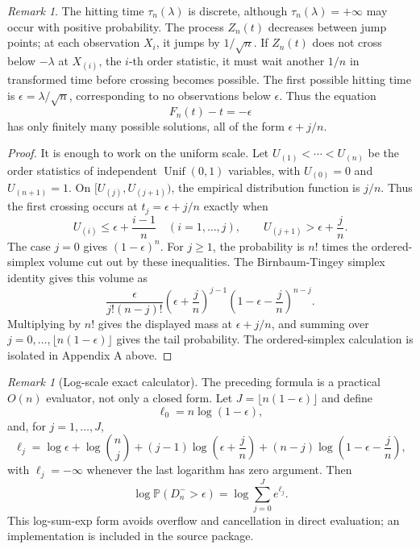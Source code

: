 \documentclass[12pt]{article}
\theoremstyle{remark}
\newtheorem{remark}[theorem]{Remark}
\begin{document}
\begin{remark}
The hitting time $\tau_n(\lambda)$ is discrete, although $\tau_n(\lambda)=+\infty$ may occur with positive probability. The process $Z_n(t)$ decreases between jump points; at each observation $X_i$, it jumps by $1/\sqrt{n}$. If $Z_n(t)$ does not cross below $-\lambda$ at $X_{(i)}$, the $i$-th order statistic, it must wait another $1/n$ in transformed time before crossing becomes possible. The first possible hitting time is $\epsilon=\lambda/\sqrt{n}$, corresponding to no observations below $\epsilon$. Thus the equation
\[
F_n(t)-t=-\epsilon
\]
has only finitely many possible solutions, all of the form $\epsilon+j/n$.
\end{remark}
\begin{proof}
It is enough to work on the uniform scale. Let
$U_{(1)}<\cdots<U_{(n)}$ be the order statistics of independent
$\operatorname{Unif}(0,1)$ variables, with $U_{(0)}=0$ and $U_{(n+1)}=1$.
On $[U_{(j)},U_{(j+1)})$, the empirical distribution function is $j/n$.
Thus the first crossing occurs at $t_j=\epsilon+j/n$ exactly when
\[
U_{(i)}\le \epsilon+\frac{i-1}{n}\quad(i=1,\ldots,j),
\qquad
U_{(j+1)}> \epsilon+\frac{j}{n}.
\]
The case $j=0$ gives $(1-\epsilon)^n$. For $j\ge1$, the probability is
$n!$ times the ordered-simplex volume cut out by these inequalities. The
Birnbaum-Tingey simplex identity \cite{birnbaum1951one} gives this volume as
\[
\frac{\epsilon}{j!(n-j)!}
\left(\epsilon+\frac{j}{n}\right)^{j-1}
\left(1-\epsilon-\frac{j}{n}\right)^{n-j}.
\]
Multiplying by $n!$ gives the displayed mass at $\epsilon+j/n$, and summing
over $j=0,\ldots,\lfloor n(1-\epsilon)\rfloor$ gives the tail probability.
The ordered-simplex calculation is isolated in Appendix A above.
\end{proof}

\begin{remark}[Log-scale exact calculator]
The preceding formula is a practical $O(n)$ evaluator, not only a closed
form. Let $J=\lfloor n(1-\epsilon)\rfloor$ and define
\[
\ell_0=n\log(1-\epsilon),
\]
and, for $j=1,\ldots,J$,
\[
\ell_j=\log\epsilon+\log\binom{n}{j}
 +(j-1)\log\left(\epsilon+\frac{j}{n}\right)
 +(n-j)\log\left(1-\epsilon-\frac{j}{n}\right),
\]
with $\ell_j=-\infty$ whenever the last logarithm has zero argument. Then
\[
\log \mathbb{P}(D_n^->\epsilon)=\log\sum_{j=0}^J e^{\ell_j}.
\]
This log-sum-exp form avoids overflow and cancellation in direct evaluation;
an implementation is included in the source package.
\end{remark}
\end{document}
